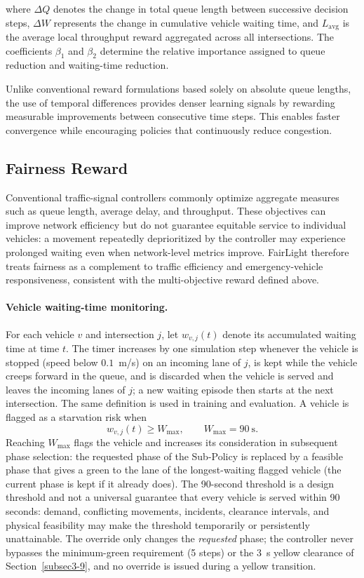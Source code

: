 \documentclass[3p,times]{elsarticle}
\theoremstyle{plain}
\theoremstyle{definition}
\begin{document}
where $\Delta Q$ denotes the change in total queue length between
successive decision steps, $\Delta W$ represents the change in
cumulative vehicle waiting time, and $L_{\text{avg}}$ is the average
local throughput reward aggregated across all intersections. The
coefficients $\beta_1$ and $\beta_2$ determine the relative importance
assigned to queue reduction and waiting-time reduction.

Unlike conventional reward formulations based solely on absolute queue
lengths, the use of temporal differences provides denser learning
signals by rewarding measurable improvements between consecutive time
steps. This enables faster convergence while encouraging policies that
continuously reduce congestion.

\subsection{Fairness Reward}

Conventional traffic-signal controllers commonly optimize aggregate measures such as queue
length, average delay, and throughput. These objectives can improve network efficiency but do
not guarantee equitable service to individual vehicles: a movement repeatedly deprioritized by
the controller may experience prolonged waiting even when network-level metrics improve.
FairLight therefore treats fairness as a complement to traffic efficiency and emergency-vehicle
responsiveness, consistent with the multi-objective reward defined above.

\paragraph{Vehicle waiting-time monitoring.}
For each vehicle $v$ and intersection $j$, let $w_{v,j}(t)$ denote its accumulated waiting time
at time $t$. The timer increases by one simulation step whenever the vehicle is stopped (speed
below $0.1$~m/s) on an incoming lane of $j$, is kept while the vehicle creeps forward in the
queue, and is discarded when the vehicle is served and leaves the incoming lanes of $j$; a new
waiting episode then starts at the next intersection. The same definition is used in training
and evaluation. A vehicle is flagged as a starvation risk when
\begin{equation}
w_{v,j}(t)\ge W_{\max},\qquad W_{\max}=90\ \text{s}.
\end{equation}
Reaching $W_{\max}$ flags the vehicle and increases its consideration in subsequent phase
selection: the requested phase of the Sub-Policy is replaced by a feasible phase that gives a
green to the lane of the longest-waiting flagged vehicle (the current phase is kept if it
already does). The 90-second threshold is a design threshold and not a universal guarantee
that every vehicle is served within 90 seconds: demand, conflicting movements, incidents,
clearance intervals, and physical feasibility may make the threshold temporarily or
persistently unattainable. The override only changes the \emph{requested} phase; the controller
never bypasses the minimum-green requirement (5 steps) or the 3~s yellow clearance of
Section~\ref{subsec3-9}, and no override is issued during a yellow transition.
\end{document}

